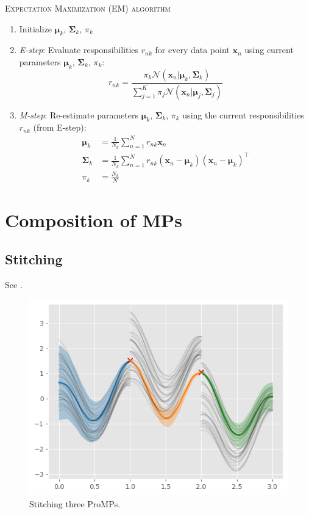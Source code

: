 \documentclass{article}
\begin{document}
\begin{algorithm}[htbp]
\caption{\textsc{Expectation Maximization (EM) algorithm}}
\label{algo:EM}
\DontPrintSemicolon
{}


\begin{enumerate}
  \item Initialize $\bm{\mu}_{k}$, $\bm{\Sigma}_{k}$, $\pi_{k}$
  \item \emph{E-step}: Evaluate responsibilities $r_{nk}$ for every data point $\bm{x}_{n}$ using current parameters $\bm{\mu}_{k}$, $\bm{\Sigma}_{k}$, $\pi_{k}$:
        \begin{equation}
          r_{nk} = \frac{\pi_{k}  \mathcal{N}(\bm{x}_{n}|\bm{\mu}_{k}, \bm{\Sigma}_{k})}{\sum^{K}_{j=1} \pi_{j}  \mathcal{N}(\bm{x}_{n}|\bm{\mu}_{j}, \bm{\Sigma}_{j})}
        \end{equation}
  \item \emph{M-step}: Re-estimate parameters $\bm{\mu}_{k}$, $\bm{\Sigma}_{k}$, $\pi_{k}$ using the current responsibilities $r_{nk}$ (from E-step):
        \begin{align}
          \bm{\mu}_{k} &= \frac{1}{N_{k}} \sum_{n=1}^{N}r_{nk}\bm{x}_{n}\\
          \bm{\Sigma}_{k} &= \frac{1}{N_{k}} \sum^{N}_{n=1} r_{nk} (\bm{x}_{n} - \bm{\mu}_{k})(\bm{x}_{n} - \bm{\mu}_{k})^{\top}\\
          \pi_{k} &= \frac{N_{k}}{N}
        \end{align}
\end{enumerate}
\end{algorithm}


\section{Composition of MPs}
\subsection{Stitching}
See .
\begin{figure}[htbp]
  \centering
  \includegraphics[width=0.5\linewidth]{fig/stitching.png}
  \caption{Stitching three ProMPs.}
  \label{fig:stitching}
\end{figure}
\end{document}
